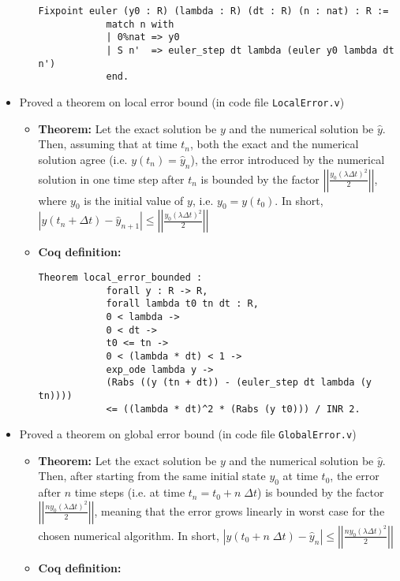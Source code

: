 \documentclass{article}
\begin{document}
\begin{itemize}
\begin{itemize}
\begin{lstlisting}[language=Coq]
            Fixpoint euler (y0 : R) (lambda : R) (dt : R) (n : nat) : R := 
            match n with
            | 0%nat => y0 
            | S n'  => euler_step dt lambda (euler y0 lambda dt n') 
            end.
        \end{lstlisting}
    \end{itemize} 
    \item Proved a theorem on local error bound (in code file \texttt{LocalError.v})
    \begin{itemize}
        \item \textbf{Theorem:} Let the exact solution be $y$ and the numerical solution be $\hat{y}$. Then, assuming that at time $t_n$, both the exact and the numerical solution agree (i.e. $y(t_n) = \hat{y}_n$), the error introduced by the numerical solution in one time step after $t_n$ is bounded by the factor $\left|\left|\frac{y_0 (\lambda \Delta t)^2}{2}\right|\right|$, where $y_0$ is the initial value of $y$, i.e. $y_0 = y(t_0)$. In short, $|y(t_n + \Delta t) - \hat{y}_{n+1}| \leq \left|\left|\frac{y_0 (\lambda \Delta t)^2}{2}\right|\right|$
        \item \textbf{Coq definition: } 
        \begin{lstlisting}[language=Coq]
            Theorem local_error_bounded : 
            forall y : R -> R, 
            forall lambda t0 tn dt : R,
            0 < lambda ->
            0 < dt -> 
            t0 <= tn -> 
            0 < (lambda * dt) < 1 -> 
            exp_ode lambda y -> 
            (Rabs ((y (tn + dt)) - (euler_step dt lambda (y tn)))) 
            <= ((lambda * dt)^2 * (Rabs (y t0))) / INR 2.
        \end{lstlisting}
    \end{itemize}
    \item Proved a theorem on global error bound (in code file \texttt{GlobalError.v})
    \begin{itemize}
        \item \textbf{Theorem:} Let the exact solution be $y$ and the numerical solution be $\hat{y}$. Then, after starting from the same initial state $y_0$ at time $t_0$, the error after $n$ time steps (i.e. at time $t_n = t_0 + n \; \Delta t$) is bounded by the factor $\left|\left|\frac{n y_0 (\lambda \Delta t)^2}{2}\right|\right|$, meaning that the error grows linearly in worst case for the chosen numerical algorithm. In short, $|y(t_0 + n \; \Delta t) - \hat{y}_{n}| \leq \left|\left|\frac{n y_0 (\lambda \Delta t)^2}{2}\right|\right|$
        \item \textbf{Coq definition:}

\end{itemize}
\end{itemize}
\end{document}
